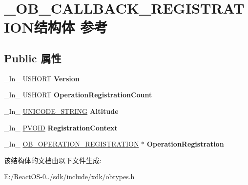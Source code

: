 \hypertarget{struct___o_b___c_a_l_l_b_a_c_k___r_e_g_i_s_t_r_a_t_i_o_n}{}\section{\+\_\+\+O\+B\+\_\+\+C\+A\+L\+L\+B\+A\+C\+K\+\_\+\+R\+E\+G\+I\+S\+T\+R\+A\+T\+I\+O\+N结构体 参考}
\label{struct___o_b___c_a_l_l_b_a_c_k___r_e_g_i_s_t_r_a_t_i_o_n}
\subsection*{Public 属性}
\begin{DoxyCompactItemize}
\item 
\mbox{\label{struct___o_b___c_a_l_l_b_a_c_k___r_e_g_i_s_t_r_a_t_i_o_n_a0a79c538bc9e64b82911094bd41cce64}} 
\+\_\+\+In\+\_\+ U\+S\+H\+O\+RT {\bfseries Version}
\item 
\mbox{\label{struct___o_b___c_a_l_l_b_a_c_k___r_e_g_i_s_t_r_a_t_i_o_n_a6a15c5cab6e5ed6ade5b9c59c273ab27}} 
\+\_\+\+In\+\_\+ U\+S\+H\+O\+RT {\bfseries Operation\+Registration\+Count}
\item 
\mbox{\label{struct___o_b___c_a_l_l_b_a_c_k___r_e_g_i_s_t_r_a_t_i_o_n_a932c6738ac089b76528de9fd65c3d3e5}} 
\+\_\+\+In\+\_\+ \hyperlink{struct___u_n_i_c_o_d_e___s_t_r_i_n_g}{U\+N\+I\+C\+O\+D\+E\+\_\+\+S\+T\+R\+I\+NG} {\bfseries Altitude}
\item 
\mbox{\label{struct___o_b___c_a_l_l_b_a_c_k___r_e_g_i_s_t_r_a_t_i_o_n_a1ec9b3e561faf5dbca68baf6f5473503}} 
\+\_\+\+In\+\_\+ \hyperlink{interfacevoid}{P\+V\+O\+ID} {\bfseries Registration\+Context}
\item 
\mbox{\label{struct___o_b___c_a_l_l_b_a_c_k___r_e_g_i_s_t_r_a_t_i_o_n_aea5c1cc120adf220119b6b0204bb7376}} 
\+\_\+\+In\+\_\+ \hyperlink{struct___o_b___o_p_e_r_a_t_i_o_n___r_e_g_i_s_t_r_a_t_i_o_n}{O\+B\+\_\+\+O\+P\+E\+R\+A\+T\+I\+O\+N\+\_\+\+R\+E\+G\+I\+S\+T\+R\+A\+T\+I\+ON} $\ast$ {\bfseries Operation\+Registration}
\end{DoxyCompactItemize}


该结构体的文档由以下文件生成\+:\begin{DoxyCompactItemize}
\item 
E\+:/\+React\+O\+S-\/0../sdk/include/xdk/obtypes.\+h\end{DoxyCompactItemize}
